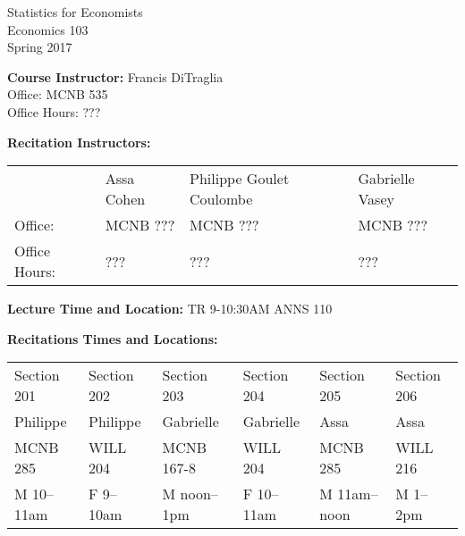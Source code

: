 \documentclass[11pt, letterpaper]{article}
\begin{document}
\thispagestyle{plain}

\begin{center}
\Large
\sc
Statistics for Economists\\
\large
Economics 103\\
\large
Spring 2017
\end{center}



\normalsize

\noindent \textbf{Course Instructor:} Francis DiTraglia \\
Office: MCNB 535\\
Office Hours: ??? 

\medskip


\noindent \textbf{Recitation Instructors:}

\medskip
\noindent

\begin{tabular}{llll}
  & Assa Cohen & Philippe Goulet Coulombe & Gabrielle Vasey\\
Office:& MCNB ??? & MCNB ??? & MCNB ??? \\ 
Office Hours:& ??? & ??? & ??? 
\end{tabular}

\medskip
 
\noindent \textbf{Lecture Time and Location:} TR 9-10:30AM ANNS 110 

\medskip

\noindent \textbf{Recitations Times and Locations:}
\medskip \noindent

\begin{tabular}{llllll}
	Section 201 & Section 202 & Section 203 & Section 204 & Section 205 & Section 206\\ 
  Philippe & Philippe & Gabrielle & Gabrielle & Assa & Assa\\
	MCNB 285 & WILL 204 & MCNB 167-8 & WILL 204 & MCNB 285 & WILL 216 \\ 
  M 10--11am & F 9--10am & M noon--1pm & F 10--11am & M 11am--noon & M 1--2pm
\end{tabular}


\medskip

%
\end{document}
